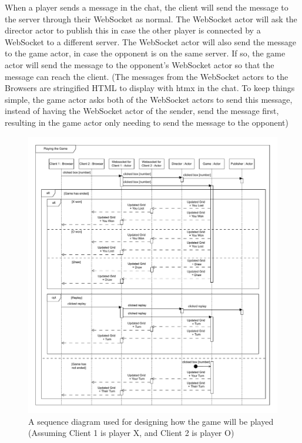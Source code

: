 \documentclass[]{final}
\begin{document}
When a player sends a message in the chat, the client will send the message to
the server through their WebSocket as normal. The WebSocket actor will ask the
director actor to publish this in case the other player is connected by a WebSocket
to a different server. The WebSocket actor will also send the message to the game
actor, in case the opponent is on the same server. If so, the game actor will
send the message to the opponent's WebSocket actor so that the message can reach
the client. (The messages from the WebSocket actors to the Browsers are
stringified HTML to display with htmx in the chat. To keep things simple, the game
actor asks both of the WebSocket actors to send this message, instead of having
the WebSocket actor of the sender, send the message first, resulting in the game
actor only needing to send the message to the opponent)

\newpage

\begin{figure}[ht!]
  \centering
  \includegraphics[width=\linewidth]{sequence_playing}
  \caption{A sequence diagram used for designing how the game will be played (Assuming Client 1 is player X, and Client 2 is player O)}
  \label{fig: 11}
\end{figure}
\end{document}
